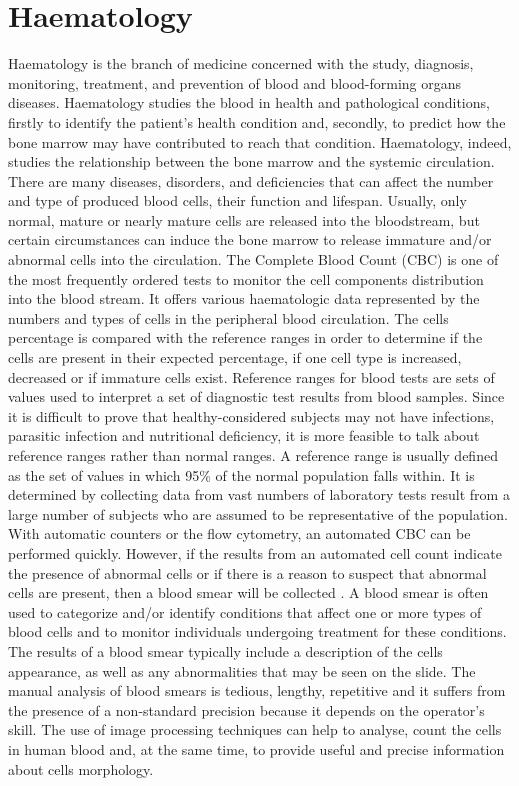 \documentclass[final,a4paper,12pt,english]{UnicaPhdThesis3}
\begin{document}
\section{Haematology} %
Haematology is the branch of medicine concerned with the study, diagnosis, monitoring, treatment, and prevention of blood and blood-forming organs diseases. Haematology studies the blood in health and pathological conditions, firstly to identify the patient’s health condition and, secondly, to predict how the bone marrow may have contributed to reach that condition. 
Haematology, indeed, studies the relationship between the bone marrow and the systemic circulation. There are many diseases, disorders, and deficiencies that can affect the number and type of produced blood cells, their function and lifespan. Usually, only normal, mature or nearly mature cells are released into the bloodstream, but certain circumstances can induce the bone marrow to release immature and/or abnormal cells into the circulation. The Complete Blood Count (CBC) is one of the most frequently ordered tests to monitor the cell components distribution into the blood stream. It offers various haematologic data represented by the numbers and types of cells in the peripheral blood circulation. The cells percentage is compared with the reference ranges in order to determine if the cells are present in their expected percentage, if one cell type is increased, decreased or if immature cells exist. Reference ranges for blood tests are sets of values used to interpret a set of diagnostic test results from blood samples. Since it is difficult to prove that healthy-considered subjects may not have infections, parasitic infection and nutritional deficiency, it is more feasible to talk about reference ranges rather than normal ranges. A reference range is usually defined as the set of values in which 95\% of the normal population falls within. It is determined by collecting data from vast numbers of laboratory tests result from a large number of subjects who are assumed to be representative of the population. With automatic counters or the flow cytometry, an automated CBC can be performed quickly. However, if the results from an automated cell count indicate the presence of abnormal cells or if there is a reason to suspect that abnormal cells are present, then a blood smear will be collected \cite{Loddo2016}. A blood smear is often used to categorize and/or identify conditions that affect one or more types of blood cells and to monitor individuals undergoing treatment for these conditions. The results of a blood smear typically include a description of the cells appearance, as well as any abnormalities that may be seen on the slide. The manual analysis of blood smears is tedious, lengthy, repetitive and it suffers from the presence of a non-standard precision because it depends on the operator's skill. The use of image processing techniques can help to analyse, count the cells in human blood and, at the same time, to provide useful and precise information about cells morphology.
\end{document}
